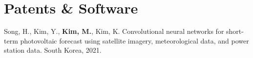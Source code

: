 \newcommand{\pkgname}[1]
  {\small \color{hlcolor-0} \textbf{#1}}

\newcommand{\pkginfo}[1]
  {\small \color{hlcolor-1} \textsc{#1}}

\newcommand{\pkgdesc}[1]
  {\small \color{maincolor} {#1}}


\section*{Patents \& Software}
\begin{cvcontent}
  \small{Song, H., Kim, Y., \textbf{Kim, M.}, Kim, K. Convolutional neural networks for short-term photovoltaic forecast using satellite imagery, meteorological data, and power station data. South Korea, 2021.}
\end{cvcontent}
